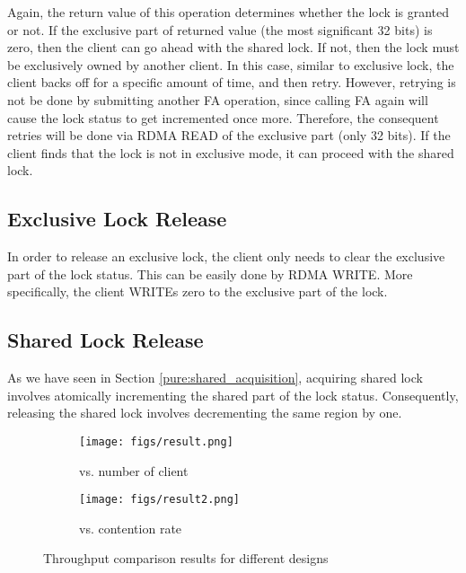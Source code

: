 \documentclass[twoside]{article}
\begin{document}
\begin{multicols}{2}
Again, the return value of this operation determines whether the lock is granted or not.
If the exclusive part of returned value (the most significant 32 bits) is zero, then the client can go ahead with the shared lock.
If not, then the lock must be exclusively owned by another client.
In this case, similar to exclusive lock, the client backs off for a specific amount of time, and then retry.
However, retrying is not be done by submitting another FA operation, since calling FA again will cause the lock status to get incremented once more.
Therefore, the consequent retries will be done via RDMA READ of the exclusive part (only 32 bits).
If the client finds that the lock is not in exclusive mode, it can proceed with the shared lock.

\subsection{Exclusive Lock Release}
In order to release an exclusive lock, the client only needs to clear the exclusive part of the lock status.
This can be easily done by RDMA WRITE.
More specifically, the client WRITEs zero to the exclusive part of the lock.


\subsection{Shared Lock Release}
As we have seen in Section \ref{pure:shared_acquisition}, acquiring shared lock involves atomically incrementing the shared part of the lock status.
Consequently, releasing the shared lock involves decrementing the same region by one.




\begin{figure*}[t!]
\begin{subfigure}{.5\textwidth}
  \centering
  \texttt{[image: figs/result.png]}
  \caption{vs. number of client}
\end{subfigure}\begin{subfigure}{.5\textwidth}
  \centering
  \texttt{[image: figs/result2.png]}
  \caption{vs. contention rate}
\end{subfigure}
\caption{Throughput comparison results for different designs}
\label{fig:comparison_result}
\end{figure*}


\end{multicols}
\end{document}
